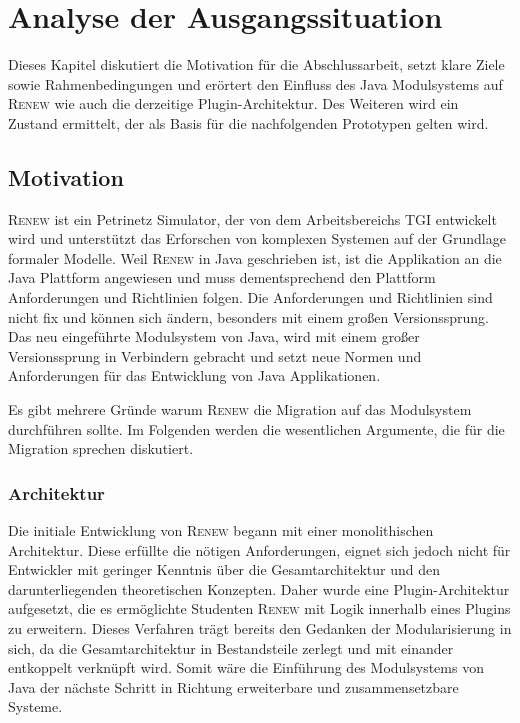 \chapter{Analyse der Ausgangssituation}\label{cha:ausgangssituation}
	Dieses Kapitel diskutiert die Motivation für die Abschlussarbeit, setzt klare Ziele sowie Rahmenbedingungen und erörtert den Einfluss des Java Modulsystems auf \textsc{Renew} wie auch die derzeitige Plugin-Architektur. Des Weiteren wird ein Zustand ermittelt, der als Basis für die nachfolgenden Prototypen gelten wird.

\section{Motivation}\label{sec:motivation}
	\textsc{Renew} ist ein Petrinetz Simulator, der von dem Arbeitsbereichs TGI entwickelt wird und unterstützt das Erforschen von komplexen Systemen auf der Grundlage formaler Modelle.\newline
	Weil \textsc{Renew} in Java geschrieben ist, ist die Applikation an die Java Plattform angewiesen und muss dementsprechend den Plattform Anforderungen und Richtlinien folgen. Die Anforderungen und Richtlinien sind nicht fix und können sich ändern, besonders mit einem großen Versionssprung. Das neu eingeführte Modulsystem von Java, wird mit einem großer Versionssprung in Verbindern gebracht und setzt neue Normen und Anforderungen für das Entwicklung von Java Applikationen. \bigbreak
	
	Es gibt mehrere Gründe warum \textsc{Renew} die Migration auf das Modulsystem durchführen sollte. Im Folgenden werden die wesentlichen Argumente, die für die Migration sprechen diskutiert.  

	\subsection{Architektur} \label{sub:architektur}
		Die initiale Entwicklung von \textsc{Renew} begann mit einer monolithischen Architektur. Diese erfüllte die nötigen Anforderungen, eignet sich jedoch nicht für Entwickler mit geringer Kenntnis über die Gesamtarchitektur und den darunterliegenden theoretischen Konzepten. Daher wurde eine Plugin-Architektur aufgesetzt, die es ermöglichte Studenten \textsc{Renew} mit Logik innerhalb eines Plugins zu erweitern. Dieses Verfahren trägt bereits den Gedanken der Modularisierung in sich, da die Gesamtarchitektur in Bestandsteile zerlegt und mit einander entkoppelt verknüpft wird. Somit wäre die Einführung des Modulsystems von Java der nächste Schritt in Richtung erweiterbare und zusammensetzbare Systeme.

